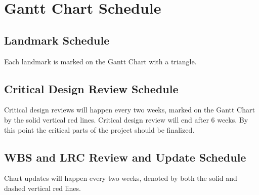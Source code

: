 \section{Gantt Chart Schedule}
\subsection{Landmark Schedule}
Each landmark is marked on the Gantt Chart with a triangle.
\subsection{Critical Design Review Schedule}
Critical design reviews will happen every two weeks, marked on the Gantt Chart by the solid vertical red lines.
Critical design review will end after 6 weeks. By this point the critical parts of the project should be finalized. 
\subsection{WBS and LRC Review and Update Schedule}
Chart updates will happen every two weeks, denoted by both the solid and dashed vertical red lines.
